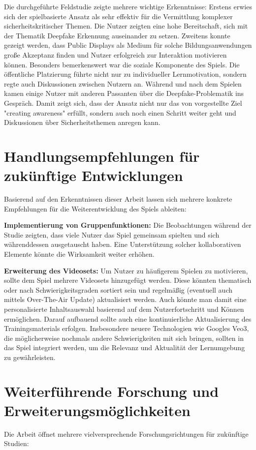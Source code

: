 Die durchgeführte Feldstudie zeigte mehrere wichtige Erkenntnisse: 
Erstens erwies sich der spielbasierte Ansatz als sehr effektiv für die Vermittlung komplexer sicherheitskritischer Themen. 
Die Nutzer zeigten eine hohe Bereitschaft, sich mit der Thematik Deepfake Erkennung auseinander zu setzen. 
Zweitens konnte gezeigt werden, dass Public Displays als Medium für solche Bildungsanwendungen große Akzeptanz finden 
und Nutzer erfolgreich zur Interaktion motivieren können. 
Besonders bemerkenswert war die soziale Komponente des Spiels. 
Die öffentliche Platzierung führte nicht nur zu individueller Lernmotivation, sondern regte auch Diskussionen zwischen Nutzern an. 
Während und nach dem Spielen kamen einige Nutzer mit anderen Passanten über die Deepfake-Problematik ins Gespräch. 
Damit zeigt sich, dass der Ansatz nicht nur das von \textcite{murtezajPublicSecurityUser2025} vorgestellte Ziel "creating awareness" erfüllt, 
sondern auch noch einen Schritt weiter geht und Diskussionen über Sicherheitsthemen anregen kann.
\section{Handlungsempfehlungen für zukünftige Entwicklungen}
Basierend auf den Erkenntnissen dieser Arbeit lassen sich mehrere konkrete Empfehlungen für die Weiterentwicklung des Spiels ableiten: 

\textbf{Implementierung von Gruppenfunktionen:}
Die Beobachtungen während der Studie zeigten, dass viele Nutzer das Spiel gemeinsam spielten und sich währenddessen ausgetauscht haben. 
Eine Unterstützung solcher kollaborativen Elemente könnte die Wirksamkeit weiter erhöhen. 

\textbf{Erweiterung des Videosets:}
Um Nutzer zu häufigerem Spielen zu motivieren, sollte dem Spiel mehrere Videosets hinzugefügt werden. 
Diese könnten thematisch oder nach Schwierigkeitsgraden sortiert sein und regelmäßig (eventuell auch mittels Over-The-Air Update) aktualisiert werden. 
Auch könnte man damit eine personalisierte Inhaltsauswahl basierend auf dem Nutzerfortschritt und Können ermöglichen.
Darauf aufbauend sollte auch eine kontinuierliche Aktualisierung des Trainingsmaterials erfolgen. 
Insbesondere neuere Technologien wie Googles Veo3, die möglicherweise nochmals andere Schwierigkeiten mit sich bringen, 
sollten in das Spiel integriert werden, um die Relevanz und Aktualität der Lernumgebung zu gewährleisten.

\section{Weiterführende Forschung und Erweiterungsmöglichkeiten}
Die Arbeit öffnet mehrere vielversprechende Forschungsrichtungen für zukünftige Studien: 

